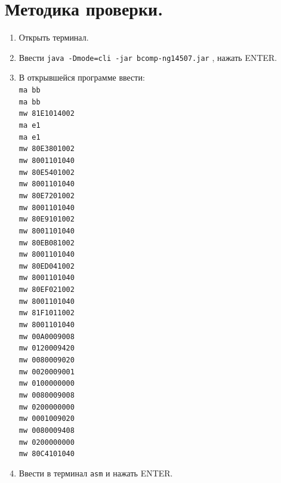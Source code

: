 \section{Методика проверки.}

\begin{enumerate}
    \item Открыть терминал.
    \item Ввести \texttt{java -Dmode=cli -jar bcomp-ng14507.jar} , нажать ENTER.
    \item В открывшейся программе ввести:   \\
    \texttt{ma bb   \\
    ma bb   \\
    mw 81E1014002   \\
    ma e1   \\
    ma e1   \\
    mw 80E3801002   \\
    mw 8001101040   \\
    mw 80E5401002   \\
    mw 8001101040   \\
    mw 80E7201002   \\
    mw 8001101040   \\
    mw 80E9101002   \\
    mw 8001101040   \\
    mw 80EB081002   \\
    mw 8001101040   \\
    mw 80ED041002   \\
    mw 8001101040   \\
    mw 80EF021002   \\
    mw 8001101040   \\
    mw 81F1011002   \\
    mw 8001101040   \\
    mw 00A0009008   \\
    mw 0120009420   \\
    mw 0080009020   \\
    mw 0020009001   \\
    mw 0100000000   \\
    mw 0080009008   \\
    mw 0200000000   \\
    mw 0001009020   \\
    mw 0080009408   \\
    mw 0200000000   \\
    mw 80C4101040}
    \item Ввести в терминал \texttt{asm} и нажать ENTER.

\end{enumerate}
